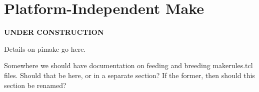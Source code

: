 \section{Platform-Independent Make}\label{sec:pimake}

\centerline{\textbf{UNDER CONSTRUCTION}}

Details on pimake go here.

Somewhere we should have documentation on feeding and breeding
makerules.tcl files.  Should that be here, or in a separate section?  If
the former, then should this section be renamed?

